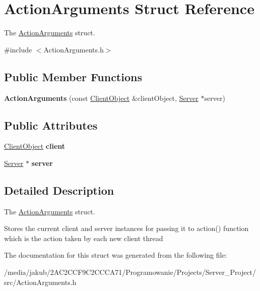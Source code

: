 \hypertarget{structActionArguments}{}\section{Action\+Arguments Struct Reference}
\label{structActionArguments}


The \hyperlink{structActionArguments}{Action\+Arguments} struct.  




{\ttfamily \#include $<$Action\+Arguments.\+h$>$}

\subsection*{Public Member Functions}
\begin{DoxyCompactItemize}
\item 
\mbox{\label{structActionArguments_a88e262eb8835107d7c45ca702cf282e1}} 
{\bfseries Action\+Arguments} (const \hyperlink{classClientObject}{Client\+Object} \&client\+Object, \hyperlink{classServer}{Server} $\ast$server)
\end{DoxyCompactItemize}
\subsection*{Public Attributes}
\begin{DoxyCompactItemize}
\item 
\mbox{\label{structActionArguments_a4e375ff0177e8f656b5d33192906df03}} 
\hyperlink{classClientObject}{Client\+Object} {\bfseries client}
\item 
\mbox{\label{structActionArguments_ac9819b7b50ae73b67aaa7619083be43a}} 
\hyperlink{classServer}{Server} $\ast$ {\bfseries server}
\end{DoxyCompactItemize}


\subsection{Detailed Description}
The \hyperlink{structActionArguments}{Action\+Arguments} struct. 

Stores the current client and server instances for passing it to action() function which is the action taken by each new client thread 

The documentation for this struct was generated from the following file\+:\begin{DoxyCompactItemize}
\item 
/media/jakub/2\+A\+C2\+C\+C\+F9\+C2\+C\+C\+C\+A71/\+Programowanie/\+Projects/\+Server\+\_\+\+Project/src/Action\+Arguments.\+h\end{DoxyCompactItemize}
